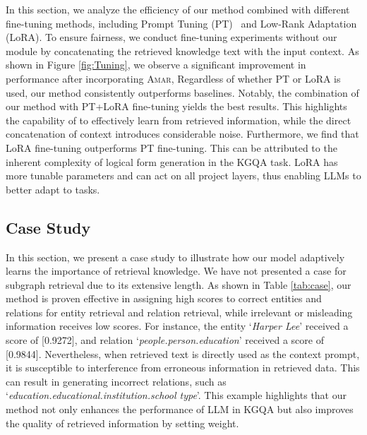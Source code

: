 In this section, we analyze the efficiency of our method combined with different fine-tuning methods, including Prompt Tuning (PT)~\cite{lester2021prompttuning} and Low-Rank Adaptation (LoRA). To ensure fairness, we conduct fine-tuning experiments without our module by concatenating the retrieved knowledge text with the input context. As shown in Figure \ref{fig:Tuning}, we observe a significant improvement in performance after incorporating \textsc{Amar}, Regardless of whether PT or LoRA is used, our method consistently outperforms baselines.  Notably, the combination of our method with PT+LoRA fine-tuning yields the best results. This highlights the capability of \model to effectively learn from retrieved information, while the direct concatenation of context introduces considerable noise.
Furthermore, we find that LoRA fine-tuning outperforms PT fine-tuning. This can be attributed to the inherent complexity of logical form generation in the KGQA task.  
LoRA has more tunable parameters and can act on all project layers, thus enabling LLMs to better adapt to tasks.


\subsection{Case Study}


In this section, we present a case study to illustrate how our model adaptively learns the importance of retrieval knowledge. We have not presented a case for subgraph retrieval due to its extensive length. As shown in Table \ref{tab:case}, our method is proven effective in assigning high scores to correct entities and relations for entity retrieval and relation retrieval, while irrelevant or misleading information receives low scores. For instance, the entity `\textit{Harper Lee}' received a score of [0.9272], and relation `\textit{people.person.education}' received a score of [0.9844].
Nevertheless, when retrieved text is directly used as the context prompt, it is susceptible to interference from erroneous information in retrieved data. This can result in generating incorrect relations, such as `\textit{education.educational.institution.school type}'. This example highlights that our method not only enhances the performance of LLM in KGQA but also improves the quality of retrieved information by setting weight.

        

